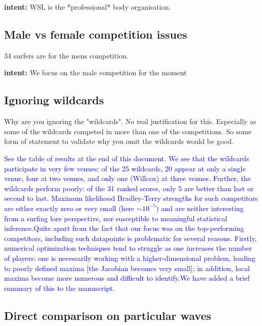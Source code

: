 \documentclass[12pt]{article}
\begin{document}
{\bf intent: }  WSL is the *professional* body organisation.  


\subsection*{Male vs female competition issues}

34 surfers are for the mens competition.


{\bf intent: } We focus on the male competition for the moment


\subsection*{Ignoring wildcards}

Why are you ignoring the "wildcards". No real justification for
this. Especially as some of the wildcards competed in more than one of
the competitions. So some form of statement to validate why you omit
the wildcards would be good.

\textcolor{blue}{See the table of results at the end of this document.
  We see that the wildcards participate in very few venues: of the 25
  wildcards, 20 appear at only a single venue, four at two venues, and
  only one (Willcox) at three venues.  Further, the wildcards perform
  poorly: of the 31 ranked scores, only 5 are better than last or
  second to last.  Maximum likelihood Bradley-Terry strengths for such
  competitors are either exactly zero or very small (here $\sim
  10^{-5}$) and are neither interesting from a surfing lore
  perspective, nor susceptible to meaningful statistical
  inference.\newline Quite apart from the fact that our focus was on
  the top-performing competitors, including such datapoints is
  problematic for several reasons.  Firstly, numerical optimization
  techniques tend to struggle as one increases the number of players:
  one is necessarily working with a higher-dimensional problem,
  leading to poorly defined maxima [the Jacobian becomes very small];
  in addition, local maxima become more numerous and difficult to
  identify.\newline We have added a brief summary of this to the
  manuscript.}

\subsection*{Direct comparison on particular waves}
\end{document}
